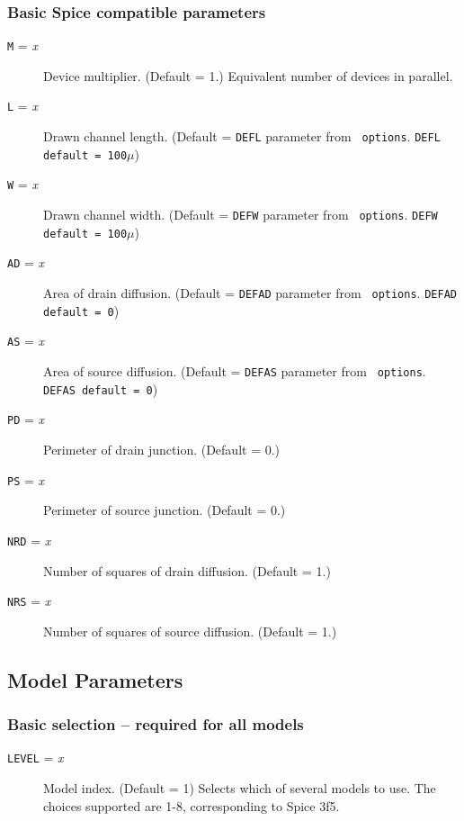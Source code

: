 \subsubsection{Basic Spice compatible parameters}

\begin{description}

\item[{\tt M} = {\it x}]
Device multiplier.  (Default = 1.)  Equivalent number of devices in parallel.

\item[{\tt L} = {\it x}]
Drawn channel length.  (Default = {\tt DEFL} parameter from {\tt
options}. {\tt DEFL default = 100$\mu$})

\item[{\tt W} = {\it x}]
Drawn channel width.  (Default = {\tt DEFW} parameter from {\tt
options}. {\tt DEFW default = 100$\mu$})

\item[{\tt AD} = {\it x}]
Area of drain diffusion.  (Default = {\tt DEFAD} parameter from {\tt
options}. {\tt DEFAD default = 0})

\item[{\tt AS} = {\it x}]
Area of source diffusion.  (Default = {\tt DEFAS} parameter from {\tt
options}. {\tt DEFAS default = 0})

\item[{\tt PD} = {\it x}]
Perimeter of drain junction.  (Default = 0.)

\item[{\tt PS} = {\it x}]
Perimeter of source junction.  (Default = 0.)

\item[{\tt NRD} = {\it x}]
Number of squares of drain diffusion.  (Default = 1.)

\item[{\tt NRS} = {\it x}]
Number of squares of source diffusion.  (Default = 1.)

\end{description}
\subsection{Model Parameters}

\subsubsection{Basic selection -- required for all models}
\begin{description}

\item[{\tt LEVEL} = {\it x}]
Model index. (Default = 1) Selects which of several models to use.
The choices supported are 1-8, corresponding to Spice 3f5.

\end{description}
